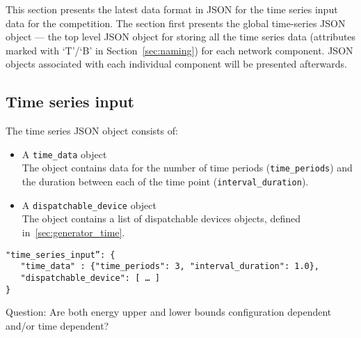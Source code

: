 \label{sec:time_series}
This section presents the latest data format in JSON for the 
time series input data for the competition.
The section first presents the global time-series JSON object --- the
top level JSON object for storing all the time series data 
(attributes marked with `T'/`B' in Section~\ref{sec:naming})
for each network component.
JSON objects associated with each individual component will be presented afterwards.


\subsection{Time series input}
\label{sec:input_data}
The time series JSON object consists of:
\begin{itemize}
    \item A \texttt{time\_data} object\\
    The object contains data for the number of time periods (\texttt{time\_periods}) and the duration
    between each of the time point (\texttt{interval\_duration}).
    \item A \texttt{dispatchable\_device} object \\
    The object contains a list of dispatchable devices objects, defined in~\ref{sec:generator_time}.
\end{itemize}

\begin{verbatim}
"time_series_input”: {
   "time_data" : {"time_periods": 3, "interval_duration": 1.0},    
   "dispatchable_device": [ … ]
}    
\end{verbatim}


\begin{todo}[]{}
Question: Are both energy upper and lower bounds configuration dependent and/or time dependent?  
\end{todo}
